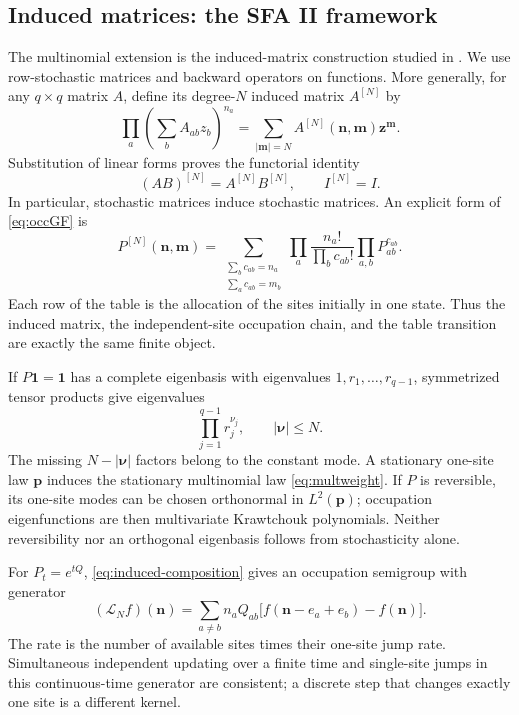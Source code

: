 \documentclass[11pt,reqno]{amsart}
\theoremstyle{definition}
\theoremstyle{remark}
\begin{document}
\subsection{Induced matrices: the SFA II framework}\label{sec:sfa-framework}
The multinomial extension is the induced-matrix construction studied
in \cite{FeinsilverSFAII2023}. We use row-stochastic matrices and
backward operators on functions. More generally, for any $q\times q$
matrix $A$, define its degree-$N$ induced matrix $A^{[N]}$ by
\[
\prod_a\left(\sum_bA_{ab}z_b\right)^{n_a}
=\sum_{|\mathbf m|=N}A^{[N]}(\mathbf n,\mathbf m)\mathbf z^{\mathbf m}.
\]
Substitution of linear forms proves the functorial identity
\begin{equation}\label{eq:induced-composition}
(AB)^{[N]}=A^{[N]}B^{[N]},\qquad I^{[N]}=I.
\end{equation}
In particular, stochastic matrices induce stochastic matrices.
An explicit form of \eqref{eq:occGF} is
\begin{equation}\label{eq:induced-table-sum}
P^{[N]}(\mathbf n,\mathbf m)
=\sum_{\substack{\sum_b c_{ab}=n_a\\\sum_a c_{ab}=m_b}}
\prod_a\frac{n_a!}{\prod_b c_{ab}!}\prod_{a,b}P_{ab}^{c_{ab}}.
\end{equation}
Each row of the table is the allocation of the sites initially in one
state. Thus the induced matrix, the independent-site occupation chain,
and the table transition are exactly the same finite object.

If $P\mathbf 1=\mathbf 1$ has a complete eigenbasis with eigenvalues
$1,r_1,\ldots,r_{q-1}$, symmetrized tensor products give eigenvalues
\begin{equation}\label{eq:induced-spectrum}
\prod_{j=1}^{q-1}r_j^{\nu_j},\qquad
|\boldsymbol\nu|\le N.
\end{equation}
The missing $N-|\boldsymbol\nu|$ factors belong to the constant mode.
A stationary one-site law $\mathbf p$ induces the stationary
multinomial law \eqref{eq:multweight}. If $P$ is reversible, its
one-site modes can be chosen orthonormal in $L^2(\mathbf p)$;
occupation eigenfunctions are then multivariate Krawtchouk polynomials.
Neither reversibility nor an orthogonal eigenbasis follows from
stochasticity alone.

For $P_t=e^{tQ}$, \eqref{eq:induced-composition} gives an occupation
semigroup with generator
\begin{equation}\label{eq:induced-generator}
(\mathcal L_N f)(\mathbf n)=
\sum_{a\ne b}n_aQ_{ab}
\bigl[f(\mathbf n-e_a+e_b)-f(\mathbf n)\bigr].
\end{equation}
The rate is the number of available sites times their one-site jump
rate. Simultaneous independent updating over a finite time and
single-site jumps in this continuous-time generator are consistent;
a discrete step that changes exactly one site is a different kernel.
\end{document}
